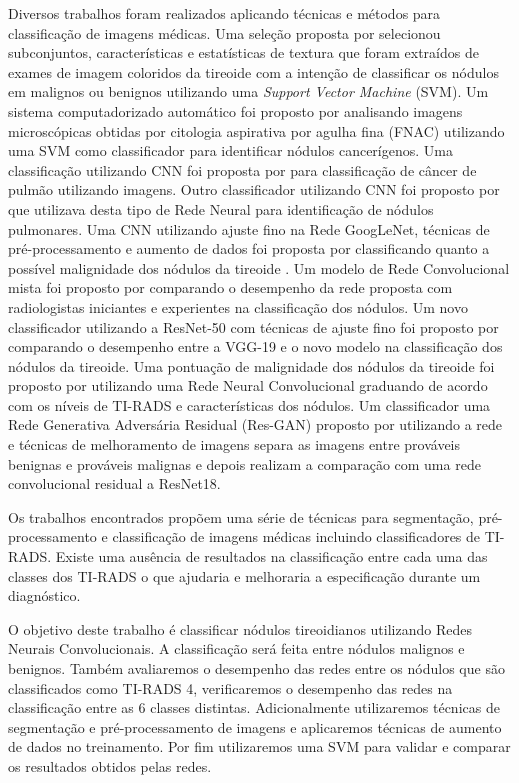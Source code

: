 \documentclass[12pt]{article}
\begin{document}
Diversos trabalhos foram realizados aplicando técnicas e métodos para classificação de imagens médicas. Uma seleção proposta por \cite{DingJ} selecionou subconjuntos, características e estatísticas de textura que foram extraídos de exames de imagem coloridos da tireoide com a intenção de classificar os nódulos em malignos ou benignos utilizando uma \textit{Support Vector Machine} (SVM). Um sistema computadorizado automático foi proposto por \cite{GopinathB} analisando imagens microscópicas obtidas por citologia aspirativa por agulha fina (FNAC) utilizando uma SVM como classificador para identificar nódulos cancerígenos. Uma classificação utilizando CNN foi proposta por \cite{SpanholF} para classificação de câncer de pulmão utilizando imagens. Outro classificador utilizando CNN foi proposto por \cite{LiW} que utilizava desta tipo de Rede Neural para identificação de nódulos pulmonares. Uma CNN utilizando ajuste fino na Rede GoogLeNet, técnicas de pré-processamento e aumento de dados foi proposta por \cite{ChiJ} classificando quanto a possível malignidade dos nódulos da tireoide . Um modelo de Rede Convolucional mista foi proposto por \cite{ParkV} comparando o desempenho da rede proposta com radiologistas iniciantes e experientes na classificação dos nódulos. Um novo classificador utilizando a ResNet-50 com técnicas de ajuste fino foi proposto por \cite{MoussaO} comparando o desempenho entre a VGG-19 e o novo modelo na classificação dos nódulos da tireoide. Uma pontuação de malignidade dos nódulos da tireoide foi proposto por \cite{StibMT} utilizando uma Rede Neural Convolucional graduando de acordo com os níveis de TI-RADS e características dos nódulos. Um classificador uma Rede Generativa Adversária Residual (Res-GAN) proposto por \cite{YuaH} utilizando a rede e técnicas de melhoramento de imagens separa as imagens entre prováveis benignas e prováveis malignas e depois realizam a comparação com uma rede convolucional residual a ResNet18.

Os trabalhos encontrados propõem uma série de técnicas para segmentação, pré-processamento e classificação de imagens médicas incluindo classificadores de TI-RADS. Existe uma ausência de resultados na classificação entre cada uma das classes dos TI-RADS o que ajudaria e melhoraria a especificação durante um diagnóstico.

O objetivo deste trabalho é classificar nódulos tireoidianos utilizando Redes Neurais Convolucionais. A classificação será feita entre nódulos malignos e benignos. Também avaliaremos o desempenho das redes entre os nódulos que são classificados como TI-RADS 4, verificaremos o desempenho das redes na classificação entre as 6 classes distintas. Adicionalmente utilizaremos técnicas de segmentação e pré-processamento de imagens e aplicaremos técnicas de aumento de dados no treinamento. Por fim utilizaremos uma SVM para validar e comparar os resultados obtidos pelas redes.
\end{document}
